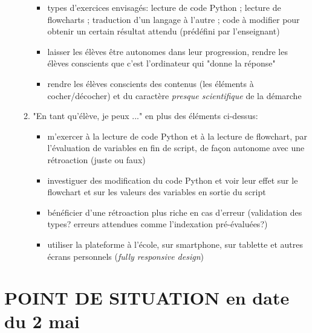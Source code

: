 \documentclass[11pt,a4paper]{article}
\begin{document}
\begin{itemize}
\begin{enumerate}
\begin{itemize}
            \item types d'exercices envisagés: lecture de code Python ; lecture de flowcharts ; traduction d'un langage à l'autre ; code à modifier pour obtenir un certain résultat attendu (prédéfini par l'enseignant)
            \item laisser les élèves être autonomes dans leur progression, rendre les élèves conscients que c'est l'ordinateur qui "donne la réponse"
            \item rendre les élèves conscients des contenus (les éléments à cocher/décocher) et du caractère \textit{presque scientifique} de la démarche
        \end{itemize}
        \item "En tant qu'élève, je peux ..." en plus des éléments ci-dessus:
        \begin{itemize}
            \item m'exercer à la lecture de code Python et à la lecture de flowchart, par l'évaluation de variables en fin de script, de façon autonome avec une rétroaction (juste ou faux)
            \item investiguer des modification du code Python et voir leur effet sur le flowchart et sur les valeurs des variables en sortie du script
            \item bénéficier d'une rétroaction plus riche en cas d'erreur (validation des types? erreurs attendues comme l'indexation pré-évaluées?)
            \item utiliser la plateforme à l'école, sur smartphone, sur tablette et autres écrans personnels (\textit{fully responsive design})
        \end{itemize}
    \end{enumerate}
\end{itemize}

\newpage
\section{POINT DE SITUATION en date du 2 mai}
\end{document}
